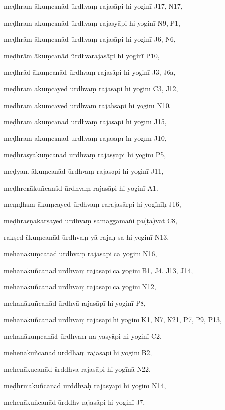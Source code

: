 \begin{marma}[hp03_099*1]


\item[meḍhram ākuṃcanād ūrdhvaṃ rajasāpi hi yoginī] J17, N17,
\item[meḍhram akuṃcanād ūrdhvaṃ rajasyāpi hi yoginī] N9, P1,
\item[meḍhrām ākuṃcanād ūrdhvaṃ rajasāpi hi yoginī] J6, N6,
\item[meḍhrām ākuṃcanād ūrdhvarajasāpi hi yoginī] P10,
\item[meḍhrād ākuṃcanād ūrdhvaṃ rajasāpi hi yoginī] J3, J6a,
\item[meḍhram ākuṃcayed ūrdhvaṃ rajasāpi hi yoginī] C3, J12, 
\item[meḍhram ākuṃcayed ūrdhvaṃ rajaḥsāpi hi yoginī] N10,
\item[meḍhram ākuṃcanād ūrdhvaṃ rajasāpi hi yogīnī] J15,
\item[meḍhrām ākuṃcanād ūrdhvaṃ rajasāpi hi yoginī] J10, 
\item[meḍhrasyākuṃcanād ūrdhvaṃ rajasyāpi hi yoginī] P5,
\item[meḍyam ākuṃcanād ūrdhvaṃ rajasopi hi yoginī] J11,
\item[meḍhreṇākuñcanād ūrdhvaṃ rajasāpi hi yoginī] A1,
\item[meṃḍham ākuṃcayed ūrdhvaṃ rarajasārpi hi yogīnīḥ] J16,
\item[meḍhrāeṇākarṣayed ūrdhvaṃ samaggamaṅi pā(ṭa)vāt] C8,
\item[rakṣed ākuṃcanād ūrdhvaṃ yā rajaḥ sa hi yoginī] N13,
\item[mehanākuṃcatād ūrdhvaṃ rajasāpi ca yoginī] N16,
\item[mehanākuñcanād ūrdhvaṃ rajasāpi ca yoginī] B1, J4, J13, J14, 
\item[mehanākuñcanād ūrdhvaṃ rajasāpī ca yoginī] N12,
\item[mehanākuñcanād ūrdhvā rajasāpī hi yoginī] P8,
\item[mehanākuñcanād ūrdhvaṃ rajasāpi hi yoginī] K1, N7, N21, P7, P9, P13, 
\item[mehanākuṃcanād ūrdhvaṃ na yasyāpi hi yoginī] C2,
\item[mehenākuñcanād ūrddhaṃ rajasāpi hi yoginī] B2,
\item[mehenākucanād ūrddhva rajasāpi hi yogīnā] N22,
\item[meḍhrmākuñcanād ūrddhvaḥ rajasyāpi hi yoginī] N14,
\item[mehenākuñcanād ūrddhv rajasāpi hi yoginī] J7,

\end{marma}
